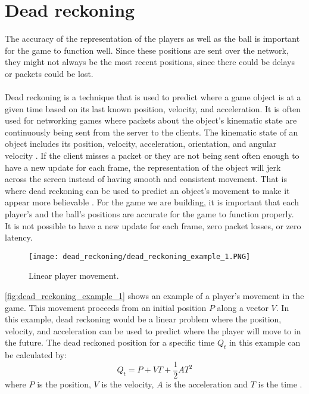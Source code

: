 \section{Dead reckoning}\label{sec:dead-reckoning}
The accuracy of the representation of the players as well as the ball is important for the game to function well.
Since these positions are sent over the network, they might not always be the most recent positions, since there could be delays or packets could be lost.
\\\\
Dead reckoning is a technique that is used to predict where a game object is at a given time based on its last known position, velocity, and acceleration.
It is often used for networking games where packets about the object's kinematic state are continuously being sent from the server to the clients.
The kinematic state of an object includes its position, velocity, acceleration, orientation, and angular velocity \cite{deadreckoning}.
If the client misses a packet or they are not being sent often enough to have a new update for each frame, the representation of the object will jerk across the screen instead of having smooth and consistent movement.
That is where dead reckoning can be used to predict an object's movement to make it appear more believable \cite{deadreckoning}.
For the game we are building, it is important that each player's and the ball's positions are accurate for the game to function properly.
\\
It is not possible to have a new update for each frame, zero packet losses, or zero latency.
\begin{figure}[H]
    \centering
    \texttt{[image: dead\_reckoning/dead\_reckoning\_example\_1.PNG]}
    \caption{Linear player movement.}
    \label{fig:dead_reckoning_example_1}
\end{figure}
\noindent
\autoref{fig:dead_reckoning_example_1} shows an example of a player's movement in the game.
This movement proceeds from an initial position $P$ along a vector $V$.
In this example, dead reckoning would be a linear problem where the position, velocity, and acceleration can be used to predict where the player will move to in the future.
The dead reckoned position for a specific time $Q_t$ in this example can be calculated by:
\begin{displaymath}
    Q_t = P + VT + \frac{1}{2}AT^2
\end{displaymath}
where $ P $ is the position, $ V $ is the velocity, $ A $ is the acceleration and $T$ is the time \cite{deadreckoning}.
